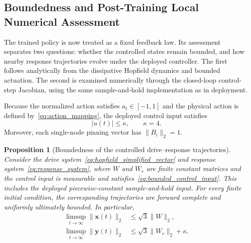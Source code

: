 \documentclass[a4paper,fleqn]{cas-dc}
\theoremstyle{plain}
\newtheorem{proposition}{Proposition}[section]
\theoremstyle{definition}
\begin{document}
\subsection{Boundedness and Post-Training Local Numerical Assessment}
\label{subsec:boundedness_local_stability}

The trained policy is now treated as a fixed feedback law. Its assessment separates two questions: whether the controlled states remain bounded, and how nearby response trajectories evolve under the deployed controller. The first follows analytically from the dissipative Hopfield dynamics and bounded actuation. The second is examined numerically through the closed-loop control-step Jacobian, using the same sample-and-hold implementation as in deployment.

Because the normalized action satisfies $a_t\in[-1,1]$ and the physical action is defined by~\eqref{eq:action_mapping}, the deployed control input satisfies
\begin{equation}
	|u(t)|\leq \kappa,
	\qquad \kappa=4.
	\label{eq:bounded_control_input}
\end{equation}
Moreover, each single-node pinning vector has $\|B_i\|_2=1$.

\begin{proposition}[Boundedness of the controlled drive--response trajectories]
\label{prop:closed_loop_boundedness}
Consider the drive system~\eqref{eq:hopfield_simplified_vector} and response system~\eqref{eq:response_system}, where $W$ and $W_r$ are finite constant matrices and the control input is measurable and satisfies~\eqref{eq:bounded_control_input}. This includes the deployed piecewise-constant sample-and-hold input. For every finite initial condition, the corresponding trajectories are forward complete and uniformly ultimately bounded. In particular,
\begin{align}
	\limsup_{t\to\infty}\|\mathbf{x}(t)\|_2
	&\leq \sqrt{3}\|W\|_2,
	\label{eq:drive_ultimate_bound}\\
	\limsup_{t\to\infty}\|\mathbf{y}(t)\|_2
	&\leq \sqrt{3}\|W_r\|_2+\kappa.
	\label{eq:response_ultimate_bound}
\end{align}
\end{proposition}
\end{document}
